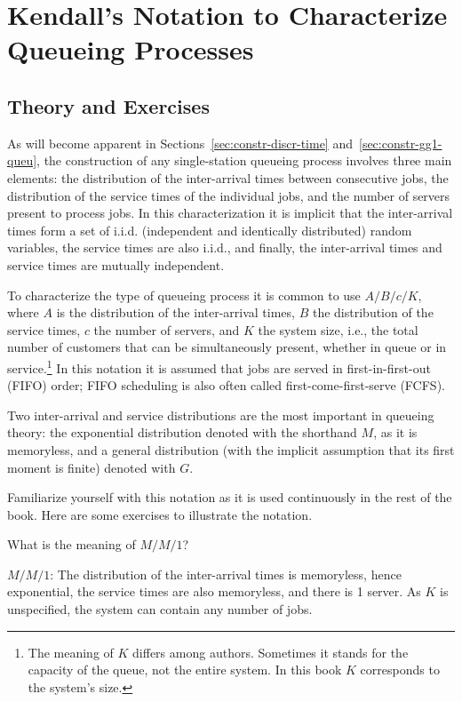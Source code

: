 
\section{Kendall's Notation to Characterize Queueing Processes}
\label{sec:kendalls-notation}




\subsection*{Theory and Exercises}

As will become apparent in Sections~\ref{sec:constr-discr-time}
and~\ref{sec:constr-gg1-queu}, the construction of any single-station queueing
process involves three main elements: 
the distribution of the
inter-arrival times between consecutive jobs, the distribution of the
service times of the individual jobs, and the number of servers
present to process jobs. In this characterization it is implicit that
the inter-arrival times form a set of i.i.d. (independent and
identically distributed) random variables, the service times are also
i.i.d., and finally, the inter-arrival times and service times are
mutually independent.

To characterize the type of queueing process it is common to use 
 $A/B/c/K$, where $A$ is the distribution of the
inter-arrival times, $B$ the distribution of the service times, $c$ the
number of servers, and $K$ the system size, i.e., the total number of customers that can be simultaneously present, whether in queue or in service.\footnote{The meaning of $K$ differs among authors. Sometimes it stands for
  the capacity of the queue, not the entire system. In this book $K$ corresponds to the system's size.}
In this notation it is assumed that jobs are served in
first-in-first-out (FIFO) order; FIFO scheduling is also often called
first-come-first-serve (FCFS). 

Two inter-arrival and service
distributions  are the most important in queueing theory: the
exponential distribution denoted with the shorthand $M$, as it is
memoryless, and a general distribution (with the implicit assumption
that its first moment is finite) denoted with $G$.

Familiarize yourself with this notation as it is used continuously in the rest of the book. Here are some exercises to illustrate the notation.

\begin{exercise}
  What is the meaning of $M/M/1$?
  \begin{solution}
$M/M/1$: The distribution of the inter-arrival times is
  memoryless, hence exponential, the service times are also
  memoryless, and there is 1 server. As $K$ is unspecified, the system can contain any number of jobs.
  \end{solution}
\end{exercise}

